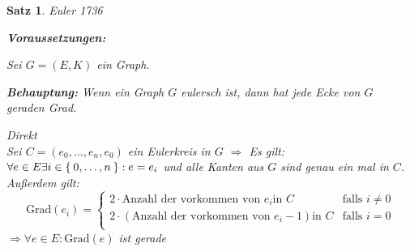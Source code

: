 \documentclass[a4paper,9pt]{scrartcl}
\newlength\Thmindent
\newenvironment{precondition}
  {\par\medskip\adjustwidth{\Thmindent}{}\normalfont\textbf{Voraussetzungen:}\par\nobreak}
  {\endadjustwidth}
\newenvironment{claim}
  {\par\medskip\adjustwidth{\Thmindent}{}\normalfont\textbf{Behauptung:}}
  {\endadjustwidth}
\theoremstyle{plain}
\newtheorem{theorem}{Satz}
\begin{document}
\begin{theorem}{Euler 1736}
    ~~~
    \begin{precondition}
        Sei $G = (E, K)$ ein Graph.
    \end{precondition}
    \begin{claim}
        Wenn ein Graph $G$ eulersch ist, dann hat jede Ecke von $G$ geraden Grad.
    \end{claim}
    \begin{Proof} Direkt\\
        Sei $C = (e_0, \dots, e_n, e_0)$ ein Eulerkreis in $G$
        $\Rightarrow $ Es gilt: $\forall e \in E \exists i \in \Set{0, \dots, n}: e = e_i$ und alle Kanten aus $G$ sind genau ein mal in $C$.\\
        Außerdem gilt: 
        \[\text{Grad}(e_i) = \begin{cases}
            2 \cdot \text{Anzahl der vorkommen von } e_i \text{in } C & \text{falls } i\neq 0\\
            2 \cdot (\text{Anzahl der vorkommen von } e_i -1) \text{in } C & \text{falls } i = 0\\
        \end{cases}
        \]
        $\Rightarrow \forall e \in E: \text{Grad}(e)$ ist gerade 
    \end{Proof}
\end{theorem}
\end{document}
